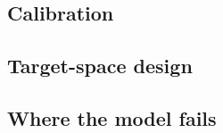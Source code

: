 \documentclass[final,1p,times]{elsarticle}
\begin{document}
\subsection{Calibration}
\label{sec:results-calibration}


\subsection{Target-space design}
\label{sec:results-target}

\subsection{Where the model fails}
\label{sec:results-australia}
\end{document}
